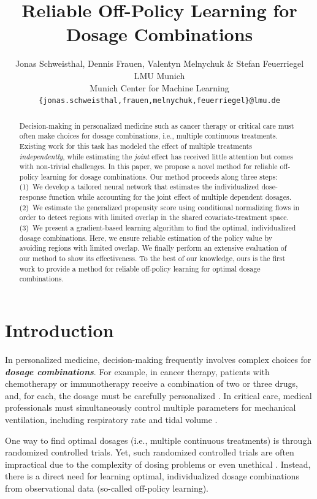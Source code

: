 \documentclass{article}
\title{Reliable Off-Policy Learning for Dosage Combinations}
\author{
  Jonas Schweisthal, Dennis Frauen, Valentyn Melnychuk \& Stefan Feuerriegel \\
  LMU Munich\\
  Munich Center for Machine Learning\\
  \texttt{\{jonas.schweisthal,frauen,melnychuk,feuerriegel\}@lmu.de} \\
}
\theoremstyle{definition}
\theoremstyle{plain}
\begin{document}
\maketitle


\begin{abstract}
Decision-making in personalized medicine such as cancer therapy or critical care must often make choices for dosage combinations, i.e., multiple continuous treatments. Existing work for this task has modeled the effect of multiple treatments \emph{independently}, while estimating the \emph{joint} effect has received little attention but comes with non-trivial challenges. In this paper, we propose a novel method for reliable off-policy learning for dosage combinations. Our method proceeds along three steps: (1)~We develop a tailored neural network that estimates the individualized dose-response function while accounting for the joint effect of multiple dependent dosages. (2)~We estimate the generalized propensity score using conditional normalizing flows in order to detect regions with limited overlap in the shared covariate-treatment space. (3)~We present a gradient-based learning algorithm to find the optimal, individualized dosage combinations. Here, we ensure reliable estimation of the policy value by avoiding regions with limited overlap. We finally perform an extensive evaluation of our method to show its effectiveness. To the best of our knowledge, ours is the first work to provide a method for reliable off-policy learning for optimal dosage combinations.
\end{abstract}

\section{Introduction}

In personalized medicine, decision-making frequently involves complex choices for \emph{\textbf{dosage combinations}}. For example, in cancer therapy, patients with chemotherapy or immunotherapy receive a combination of two or three drugs, and, for each, the dosage must be carefully personalized \cite{Fisusi.2019, Wu.2020b}. In critical care, medical professionals must simultaneously control multiple parameters for mechanical ventilation, including respiratory rate and tidal volume \cite{Grasselli.2021}. 


One way to find optimal dosages  (i.e., multiple continuous treatments) is through randomized controlled trials. Yet, such randomized controlled trials are often impractical due to the complexity of dosing problems or even unethical \cite{Robins.2000}. Instead, there is a direct need for learning optimal, individualized dosage combinations from observational data (so-called off-policy learning). 
\end{document}
